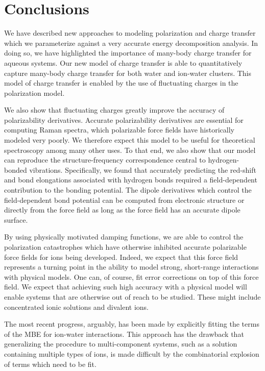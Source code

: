\documentclass[journal=jctcce,manuscript=article]{achemso}
\begin{document}
\section*{Conclusions}

We have described new approaches to modeling polarization and charge transfer which we parameterize against a very accurate energy decomposition analysis. In doing so, we have highlighted the importance of many-body charge transfer for aqueous systems. Our new model of charge transfer is able to quantitatively capture many-body charge transfer for both water and ion-water clusters. This model of charge transfer is enabled by the use of fluctuating charges in the polarization model.

We also show that fluctuating charges greatly improve the accuracy of polarizability derivatives. Accurate polarizability derivatives are essential for computing Raman spectra, which polarizable force fields have historically modeled very poorly. We therefore expect this model to be useful for theoretical spectroscopy among many other uses. To that end, we also show that our model can reproduce the structure-frequency correspondence central to hydrogen-bonded vibrations. Specifically, we found that accurately predicting the red-shift and bond elongations associated with hydrogen bonds required a field-dependent contribution to the bonding potential. The dipole derivatives which control the field-dependent bond potential can be computed from electronic structure or directly from the force field as long as the force field has an accurate dipole surface.

By using physically motivated damping functions, we are able to control the polarization catastrophes which have otherwise inhibited accurate polarizable force fields for ions being developed. Indeed, we expect that this force field represents a turning point in the ability to model strong, short-range interactions with physical models. One can, of course, fit error corrections on top of this force field. We expect that achieving such high accuracy with a physical model will enable systems that are otherwise out of reach to be studied. These might include concentrated ionic solutions and divalent ions.

The most recent
progress, arguably, has been made by explicitly fitting the terms of the MBE for
ion-water interactions.\cite{zhuang2022hydration,caruso2022accurate} This approach
has the drawback that generalizing the procedure to multi-component systems,
such as a solution containing multiple types of ions, is made difficult by
the combinatorial explosion of terms which need to be fit.
\end{document}
